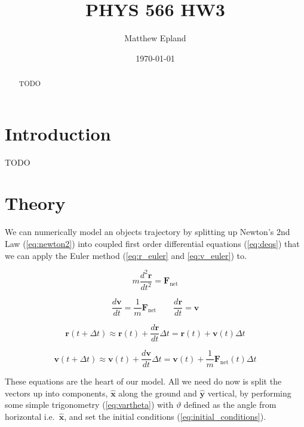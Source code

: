 \documentclass[notitlepage,aps,prd,nofootinbib]{revtex4-1}
\begin{document}
\title{PHYS 566 HW3}
\author{Matthew Epland}

\date{\today}

\begin{abstract}
TODO
\end{abstract}\maketitle


\section{Introduction}
\label{sec:intro}
TODO

\section{Theory}
\label{sec:theory}
We can numerically model an objects trajectory by splitting up Newton's 2nd Law (\ref{eq:newton2}) into coupled first order differential equations (\ref{eq:deqs}) that we can apply the Euler method (\ref{eq:r_euler} and \ref{eq:v_euler}) to.

\begin{equation} \label{eq:newton2}
m \frac{d^{2} \mathbf{r}}{d t^{2}} = \mathbf{F}_{\text{net}} 
\end{equation}

\begin{equation} \label{eq:deqs}
\frac{d \mathbf{v}}{d t} = \frac{1}{m} \mathbf{F}_{\text{net}}
\qquad
\frac{d \mathbf{r}}{d t} = \mathbf{v}
\end{equation}

\begin{equation} \label{eq:r_euler}
\mathbf{r}\left(t + \Delta t\right) \approx \mathbf{r}\left(t\right) + \frac{d \mathbf{r}}{d t} \Delta t = \mathbf{r}\left(t\right) + \mathbf{v}\left(t\right) \Delta t
\end{equation}

\begin{equation} \label{eq:v_euler}
\mathbf{v}\left(t + \Delta t\right) \approx \mathbf{v}\left(t\right) + \frac{d \mathbf{v}}{d t} \Delta t = \mathbf{v}\left(t\right) + \frac{1}{m}\mathbf{F}_{\text{net}}\left(t\right) \Delta t
\end{equation}

These equations are the heart of our model. All we need do now is split the vectors up into components, $\hat{\mathbf{x}}$ along the ground and $\hat{\mathbf{y}}$ vertical, by performing some simple trigonometry (\ref{eq:vartheta}) with $\vartheta$ defined as the angle from horizontal i.e.\ $\hat{\mathbf{x}}$, and set the initial conditions (\ref{eq:initial_conditions}).
\end{document}

